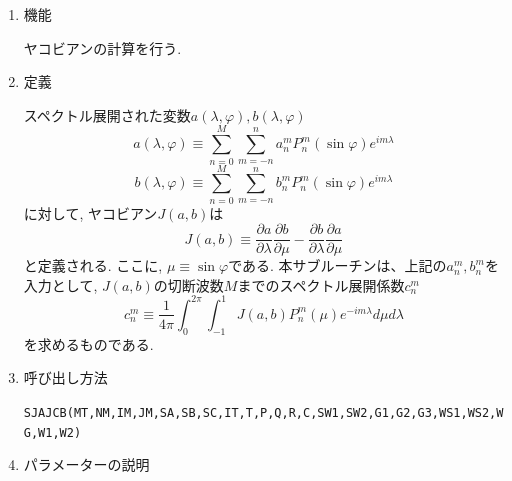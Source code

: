\documentclass[a4j]{jarticle}
\begin{document}
\begin{enumerate}

\item 機能

 ヤコビアンの計算を行う.

\item 定義

スペクトル展開された変数$a(\lambda,\varphi), b(\lambda,\varphi)$
\begin{equation}
a(\lambda,\varphi)\equiv\sum_{n=0}^M\sum_{m=-n}^n 
a^m_n P^m_n(\sin\varphi) e^{im\lambda}
\end{equation}
\begin{equation}
b(\lambda,\varphi)\equiv\sum_{n=0}^M\sum_{m=-n}^n
b^m_n P^m_n(\sin\varphi) e^{im\lambda}
\end{equation}
に対して, ヤコビアン$J(a,b)$は
\begin{equation}
J(a,b)\equiv
 \frac{\partial a}{\partial\lambda}\frac{\partial b}{\partial\mu}
-\frac{\partial b}{\partial\lambda}\frac{\partial a}{\partial\mu}
\end{equation}
と定義される. ここに, $\mu\equiv\sin\varphi$である.
本サブルーチンは、上記の$a^m_n, b^m_n$を入力として,
$J(a,b)$の切断波数$M$までのスペクトル展開係数$c^m_n$
\begin{equation}
c^m_n\equiv\frac1{4\pi}\int^{2\pi}_0\int^1_{-1}J(a,b)P^m_n(\mu)
e^{-im\lambda}d\mu d\lambda
\end{equation}
を求めるものである.

\item 呼び出し方法 

{\tt SJAJCB(MT,NM,IM,JM,SA,SB,SC,IT,T,P,Q,R,C,SW1,SW2,G1,G2,G3,WS1,WS2,WG,W1,W2)}

\item パラメーターの説明


\end{enumerate}
\end{document}
